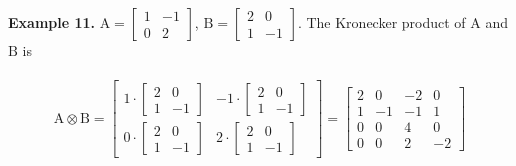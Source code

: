 \documentclass[11pt,a4paper]{article}
\begin{document}
\textbf{Example 11.}
	$
	\mathrm{A} = 
	\begin{bmatrix}
 		1 & -1 \\
 		0 & 2
 	\end{bmatrix}
 	$,
 	$
	\mathrm{B} = 
	\begin{bmatrix}
 		2 & 0 \\
 		1 & -1
 	\end{bmatrix}.
 	$
 	The Kronecker product of $\mathrm{A}$ and $\mathrm{B}$ is\\
\\
$$
\mathrm{A} \otimes \mathrm{B} =
\left[
\begin{array}{c|c}
1\cdot \begin{bmatrix}
 		2 & 0 \\
 		1 & -1
 	\end{bmatrix} & -1\cdot \begin{bmatrix}
 		2 & 0 \\
 		1 & -1
 	\end{bmatrix} \\
\hline
0\cdot \begin{bmatrix}
 		2 & 0 \\
 		1 & -1
 	\end{bmatrix} & 2\cdot \begin{bmatrix}
 		2 & 0 \\
 		1 & -1
 	\end{bmatrix}
\end{array}
\right]
=
\begin{bmatrix}
 		2 &  0 & -2 & 0 \\
 		1 & -1 & -1 & 1 \\
 		0 &  0 &  4 & 0 \\
 		0 &  0 &  2 & -2
\end{bmatrix}
$$

%
\end{document}
